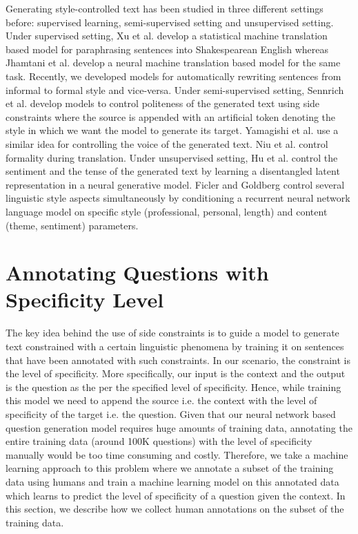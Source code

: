 \documentclass[11pt,a4paper]{article}
\begin{document}
Generating style-controlled text has been studied in three different settings before: supervised learning, semi-supervised setting and unsupervised setting.
Under supervised setting, Xu et al. \cite{xu2012paraphrasing} develop a statistical machine translation based model for paraphrasing sentences into Shakespearean English whereas 
Jhamtani et al. \cite{jhamtani2017shakespearizing} develop a neural machine translation based model for the same task. 
Recently, we \cite{RaoT18} developed models for automatically rewriting sentences from informal to formal style and vice-versa. 
Under semi-supervised setting,  Sennrich et al. \cite{sennrich2016controlling} develop models to control politeness of the generated text using side constraints where the source is appended with an artificial token denoting the style in which we want the model to generate its target. Yamagishi et al. \cite{yamagishi2016controlling} use a similar idea for controlling the voice of the generated text. 
Niu et al. \cite{niu2017study,niu2018multi} control formality during translation. 
Under unsupervised setting, Hu et al. \cite{hu2017toward} control the sentiment and the tense of the generated text by learning a disentangled latent representation in a neural generative model. 
Ficler and Goldberg \cite{ficler2017controlling} control several linguistic style aspects simultaneously by conditioning a recurrent neural network language model on specific style (professional, personal, length) and content (theme, sentiment) parameters. 


\section{Annotating Questions with Specificity Level}

The key idea behind the use of side constraints is to guide a model to generate text constrained with a certain linguistic phenomena by training it on sentences that have been annotated with such constraints. In our scenario, the constraint is the level of specificity. More specifically, our input is the context and the output is the question as the per the specified level of specificity. Hence, while training this model we need to append the source i.e. the context with the level of specificity of the target i.e. the question. Given that our neural network based question generation model requires huge amounts of training data, annotating the entire training data  (around 100K questions) with the level of specificity manually would be too time consuming and costly. Therefore, we take a machine learning approach to this problem where we annotate a subset of the training data using humans and train a machine learning model on this annotated data which learns to predict the level of specificity of a question given the context. In this section, we describe how we collect human annotations on the subset of the training data. 
\end{document}
